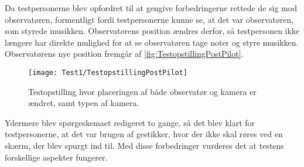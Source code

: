 Da testpersonerne blev opfordret til at gengive forbedringerne rettede de sig mod observatøren, formentligt fordi testpersonerne kunne se, at det var observatøren, som styrede musikken. Observatørens position ændres derfor, så testpersonen ikke længere har direkte mulighed for at se observatøren tage noter og styre musikken. Observatørens nye position fremgår af \autoref{fig:TestopstillingPostPilot}. 
%
\begin{figure}[H]
	\centering
	\texttt{[image: Test1/TestopstillingPostPilot]}
	\caption{Testopstilling hvor placeringen af både observatør og kamera er ændret, samt typen af kamera.}
	\label{fig:TestopstillingPostPilot}
\end{figure}
\noindent
% 
Ydermere blev spørgeskemaet redigeret to gange, så det blev klart for testpersonerne, at det var brugen af gestikker, hvor der ikke skal røres ved en skærm, der blev spurgt ind til. \blankline
%
Med disse forbedringer vurderes det at testens forskellige aspekter fungerer.  
 

